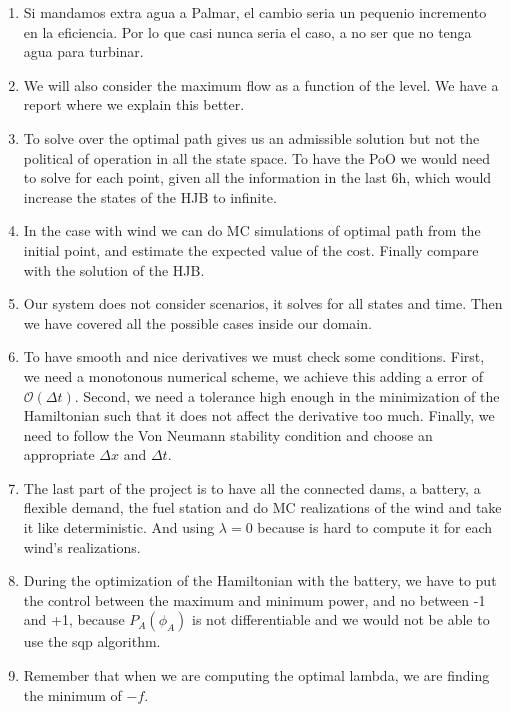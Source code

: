 \documentclass[12pt]{article}
\theoremstyle{definition}
\theoremstyle{remark}
\begin{document}
\begin{enumerate}
\item Si mandamos extra agua a Palmar, el cambio seria un pequenio incremento en la eficiencia. Por lo que casi nunca seria el caso, a no ser que no tenga agua para turbinar.

\item We will also consider the maximum flow as a function of the level. We have a report where we explain this better.

\item To solve over the optimal path gives us an admissible solution but not the political of operation in all the state space. To have the PoO we would need to solve for each point, given all the information in the last 6h, which would increase the states of the HJB to infinite.

\item In the case with wind we can do MC simulations of optimal path from the initial point, and estimate the expected value of the cost. Finally compare with the solution of the HJB.

\item Our system does not consider scenarios, it solves for all states and time. Then we have covered all the possible cases inside our domain.

\item To have smooth and nice derivatives we must check some conditions. First, we need a monotonous numerical scheme, we achieve this adding a error of $\mathcal{O}(\Delta t)$. Second, we need a tolerance high enough in the minimization of the Hamiltonian such that it does not affect the derivative too much. Finally, we need to follow the Von Neumann stability condition and choose an appropriate $\Delta x$ and $\Delta t$.

\item The last part of the project is to have all the connected dams, a battery, a flexible demand, the fuel station and do MC realizations of the wind and take it like deterministic. And using $\lambda=0$ because is hard to compute it for each wind's realizations.

\item During the optimization of the Hamiltonian with the battery, we have to put the control between the maximum and minimum power, and no between -1 and +1, because $P_A(\phi_A)$ is not differentiable and we would not be able to use the sqp algorithm.

\item Remember that when we are computing the optimal lambda, we are finding the minimum of $-f$.


\end{enumerate}
\end{document}
